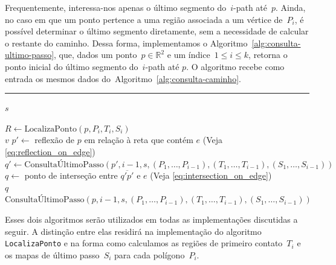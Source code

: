 \documentclass[11pt]{article}
\newcounter{algorithm}
\newcommand{\alglabel}[1]{%
	\refstepcounter{algorithm}%
	\label{#1}%
}
\newcommand{\algref}[1]{\ref{#1}}
\begin{document}
Frequentemente, interessa-nos apenas o último segmento do~\(i\)-path até~\(p\). Ainda, no caso em que um ponto pertence a uma região associada a um vértice de~\(P_i\), é possível determinar o último segmento diretamente, sem a necessidade de calcular o restante do caminho. Dessa forma, implementamos o Algoritmo~\algref{alg:consulta-ultimo-passo}, que, dados um ponto~\(p \in \mathbb{R}^2\) e um índice~\(1 \leq i \leq k\), retorna o ponto inicial do último segmento do~\(i\)-path até \(p\). O algoritmo recebe como entrada os mesmos dados do~Algoritmo~\algref{alg:consulta-caminho}.

\begin{algorithm}[!ht]
\alglabel{alg:consulta-ultimo-passo}
\caption{Consulta Último Passo}
\vspace{0.3em}
\hrule
\vspace{0.3em}

 {

	 {
		\Return {} \(s\)
	}

	\(R \leftarrow \text{LocalizaPonto}(p, P_i, T_i, S_i)\) \\

	 {
		\Return {} \(v\)
	}
	 {
		\(p' \leftarrow\) reflexão de \(p\) em relação à reta que contém \(e\) (Veja \ref{eq:reflection_on_edge}) \\
		\(q' \leftarrow \text{ConsultaÚltimoPasso}(p', i - 1, s, (P_1, \dots, P_{i - 1}), (T_1, \dots, T_{i - 1}), (S_1, \dots, S_{i - 1}))\) \\
		\(q \leftarrow\) ponto de interseção entre \(\overline{q' p'}\) e \(e\) (Veja \ref{eq:intersection_on_edge}) \\
		\Return {} \(q\)
	}
	 {
		\Return {} \(\text{ConsultaÚltimoPasso}(p, i - 1, s, (P_1, \dots, P_{i - 1}), (T_1, \dots, T_{i - 1}), (S_1, \dots, S_{i - 1}))\)
	}
}

\end{algorithm}

Esses dois algoritmos serão utilizados em todas as implementações discutidas a seguir. A distinção entre elas residirá na implementação do algoritmo \texttt{LocalizaPonto} e na forma como calculamos as regiões de primeiro contato~\(T_i\) e os mapas de último passo~\(S_i\) para cada polígono~\(P_i\).
\end{document}
